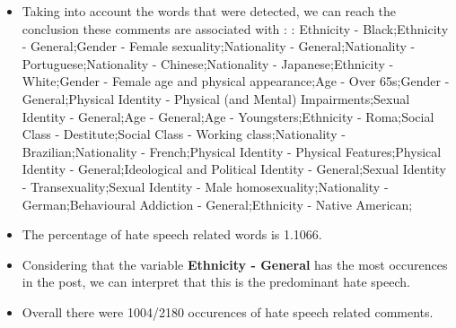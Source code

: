 \documentclass[11pt]{article}
\begin{document}
\begin{itemize}\item Taking into account the words that were detected, we can reach the conclusion these comments are associated with : : Ethnicity - Black;Ethnicity - General;Gender - Female sexuality;Nationality - General;Nationality - Portuguese;Nationality - Chinese;Nationality - Japanese;Ethnicity - White;Gender - Female age and physical appearance;Age - Over 65s;Gender - General;Physical Identity - Physical (and Mental) Impairments;Sexual Identity - General;Age - General;Age - Youngsters;Ethnicity - Roma;Social Class - Destitute;Social Class - Working class;Nationality - Brazilian;Nationality - French;Physical Identity - Physical Features;Physical Identity - General;Ideological and Political Identity - General;Sexual Identity - Transexuality;Sexual Identity - Male homosexuality;Nationality - German;Behavioural Addiction - General;Ethnicity - Native American;%

\item The percentage of hate speech related words is 1.1066.

\item Considering that the variable \textbf{Ethnicity - General} has the most occurences in the post, we can interpret that this is the predominant hate speech.

\item Overall there were 1004/2180 occurences of hate speech related comments.\end{itemize}
\end{document}
